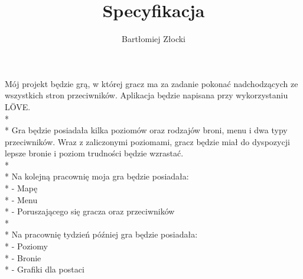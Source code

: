 \documentclass[a4paper,12pt]{article}
\title{Specyfikacja}
\author{Bartłomiej Złocki}
\begin{document}
 
\maketitle

Mój projekt będzie grą, w której gracz ma za zadanie pokonać nadchodzących ze wszystkich stron przeciwników. Aplikacja będzie napisana przy wykorzystaniu LÖVE.
\\*
\\*
Gra będzie posiadała kilka poziomów oraz rodzajów broni, menu i dwa typy przeciwników. Wraz z zaliczonymi poziomami, gracz będzie miał do dyspozycji lepsze bronie i poziom trudności będzie wzrastać.
\\*
\\*
Na kolejną pracownię moja gra będzie posiadała:
\\*
- Mapę
\\*
- Menu
\\*
- Poruszającego się gracza oraz przeciwników
\\*
\\*
Na pracownię tydzień później gra będzie posiadała:
\\*
- Poziomy
\\*
- Bronie
\\*
- Grafiki dla postaci
\end{document}
